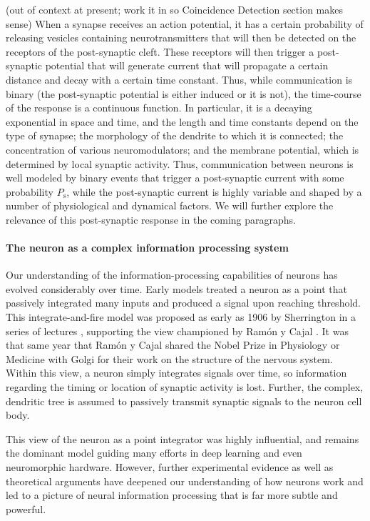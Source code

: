 \documentclass[twocolumn]{article}
\begin{document}
(out of context at present; work it in so Coincidence Detection section makes sense)
When a synapse receives an action potential, it has a certain probability of releasing vesicles containing neurotransmitters that will then be detected on the receptors of the post-synaptic cleft. These receptors will then trigger a post-synaptic potential that will generate current that will propagate a certain distance and decay with a certain time constant. Thus, while communication is binary (the post-synaptic potential is either induced or it is not), the time-course of the response is a continuous function. In particular, it is a decaying exponential in space and time, and the length and time constants depend on the type of synapse; the morphology of the dendrite to which it is connected; the concentration of various neuromodulators; and the membrane potential, which is determined by local synaptic activity. Thus, communication between neurons is well modeled by binary events that trigger a post-synaptic current with some probability $P_{\mathrm{s}}$, while the post-synaptic current is highly variable and shaped by a number of physiological and dynamical factors. We will further explore the relevance of this post-synaptic response in the coming paragraphs. 

\paragraph{The neuron as a complex information processing system}
Our understanding of the information-processing capabilities of neurons has evolved considerably over time. Early models treated a neuron as a point that passively integrated many inputs and produced a signal upon reaching threshold. This integrate-and-fire model was proposed as early as 1906 by Sherrington in a series of lectures \cite{sh1906}, supporting the view championed by Ram\'{o}n y Cajal \cite{ra1908}. It was that same year that Ram\'{o}n y Cajal shared the Nobel Prize in Physiology or Medicine with Golgi for their work on the structure of the nervous system. Within this view, a neuron simply integrates signals over time, so information regarding the timing or location of synaptic activity is lost. Further, the complex, dendritic tree is assumed to passively transmit synaptic signals to the neuron cell body. 

This view of the neuron as a point integrator was highly influential, and remains the dominant model guiding many efforts in deep learning and even neuromorphic hardware. However, further experimental evidence as well as theoretical arguments have deepened our understanding of how neurons work and led to a picture of neural information processing that is far more subtle and powerful. 
\end{document}

